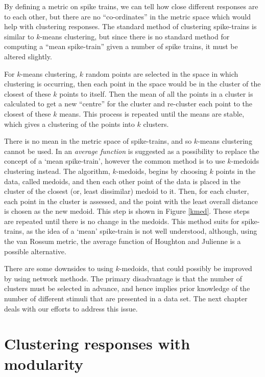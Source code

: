 By defining a metric on spike trains, we can tell how close different responses 
are to each other, but there are no ``co-ordinates'' in the metric space which 
would help with clustering responses.  The standard method of clustering 
spike-trains is similar to $k$-means clustering, but since there is no standard 
method for computing a ``mean spike-train'' given a number of spike trains, it 
must be altered slightly.

For $k$-means clustering, $k$ random points are selected in the space in which 
clustering is occurring, then each point in the space would be in the cluster of 
the closest of these $k$ points to itself.  Then the mean of all 
the points in a cluster is calculated to get a new ``centre'' for the cluster and re-cluster 
each point to the closest of these $k$ means.  This process is repeated until 
the means are stable, which gives a clustering of the points into $k$ clusters.

There is no mean in the metric space of spike-trains, and so  
$k$-means clustering cannot be used.  In \cite{JulienneHoughton2012a} an \emph{average function} is suggested as a possibility to replace the concept of a `mean spike-train', however  the common method is to use $k$-medoids clustering instead.  The algorithm, 
$k$-medoids, begins by choosing $k$ points in the data, called medoids, 
and then  each other point of the data is placed in the cluster of the 
closest (or, least dissimilar) medoid to it.  Then, for each cluster, 
 each point in the cluster is assessed, and the point with 
the least overall distance is chosen as the new medoid. This step is shown in Figure 
\ref{kmed}. These steps are repeated until there is no change in the 
medoids.  This method suits for spike-trains, as the idea of a `mean'
spike-train is not well understood, although, using the van Rossum metric, the average function of Houghton and Julienne is a possible alternative.

There are some downsides to using $k$-medoids, that could possibly be 
improved by using network methods.  The primary disadvantage is that the number of 
 clusters must be selected in advance, and hence implies prior knowledge of the number of different 
stimuli that are presented in a data set.  The next chapter deals with our 
efforts to address this issue.



\section{Clustering responses with modularity}


